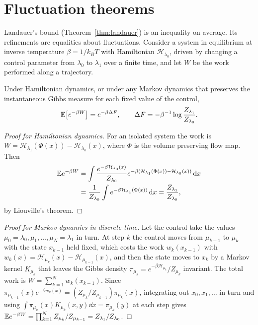 \section{Fluctuation theorems}

Landauer's bound (Theorem~\ref{thm:landauer}) is an inequality on average. Its refinements are equalities about fluctuations. Consider a system in equilibrium at inverse temperature $\beta = 1/k_BT$ with Hamiltonian $\mathcal H_{\lambda_0}$, driven by changing a control parameter from $\lambda_0$ to $\lambda_1$ over a finite time, and let $W$ be the work performed along a trajectory.

\begin{theorem}[Jarzynski]
Under Hamiltonian dynamics, or under any Markov dynamics that preserves the instantaneous Gibbs measure for each fixed value of the control,
\[
\mathbb{E}\big[e^{-\beta W}\big] = e^{-\beta\Delta F},\qquad\Delta F = -\beta^{-1}\log\frac{Z_{\lambda_1}}{Z_{\lambda_0}}.
\]
\end{theorem}

\begin{proof}[Proof for Hamiltonian dynamics]
For an isolated system the work is $W = \mathcal H_{\lambda_1}(\Phi(x))-\mathcal H_{\lambda_0}(x)$, where $\Phi$ is the volume preserving flow map. Then
\[
\begin{aligned}\mathbb{E} e^{-\beta W} &= \int\frac{e^{-\beta\mathcal H_{\lambda_0}(x)}}{Z_{\lambda_0}}e^{-\beta(\mathcal H_{\lambda_1}(\Phi(x))-\mathcal H_{\lambda_0}(x))}\,\mathrm{d} x\\ &= \frac{1}{Z_{\lambda_0}}\int e^{-\beta\mathcal H_{\lambda_1}(\Phi(x))}\,\mathrm{d} x = \frac{Z_{\lambda_1}}{Z_{\lambda_0}},\end{aligned}
\]
by Liouville's theorem.
\end{proof}

\begin{proof}[Proof for Markov dynamics in discrete time]
Let the control take the values $\mu_0 = \lambda_0,\mu_1,\dots,\mu_N = \lambda_1$ in turn. At step $k$ the control moves from $\mu_{k-1}$ to $\mu_k$ with the state $x_{k-1}$ held fixed, which costs the work $w_k(x_{k-1})$ with $w_k(x) = \mathcal H_{\mu_k}(x)-\mathcal H_{\mu_{k-1}}(x)$, and then the state moves to $x_k$ by a Markov kernel $K_{\mu_k}$ that leaves the Gibbs density $\pi_{\mu_k} = e^{-\beta\mathcal H_{\mu_k}}/Z_{\mu_k}$ invariant. The total work is $W = \sum_{k=1}^Nw_k(x_{k-1})$. Since $\pi_{\mu_{k-1}}(x)e^{-\beta w_k(x)} = (Z_{\mu_k}/Z_{\mu_{k-1}})\pi_{\mu_k}(x)$, integrating out $x_0,x_1,\dots$ in turn and using $\int\pi_{\mu_k}(x)K_{\mu_k}(x,y)\dd x = \pi_{\mu_k}(y)$ at each step gives $\mathbb{E} e^{-\beta W} = \prod_{k=1}^NZ_{\mu_k}/Z_{\mu_{k-1}} = Z_{\lambda_1}/Z_{\lambda_0}$.
\end{proof}

